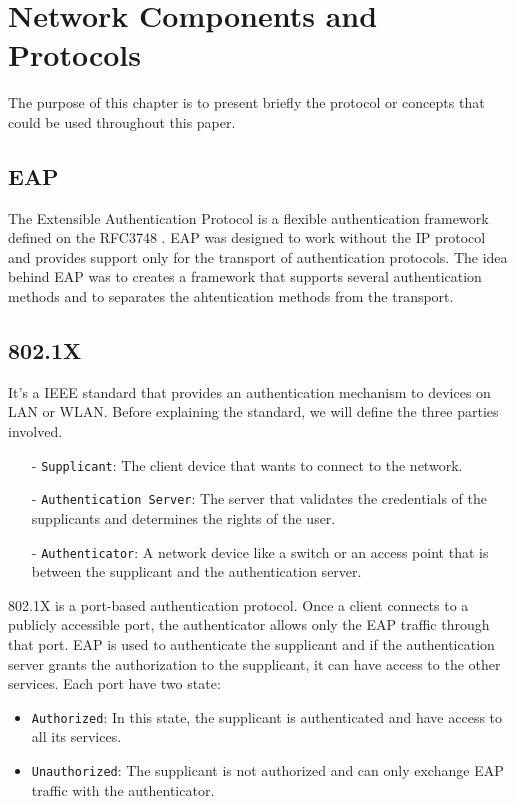 
\chapter{Network Components and Protocols} %

\label{Chapter3} %


The purpose of this chapter is to present briefly the protocol or concepts that could be used throughout this paper.
\section{EAP}
The Extensible Authentication Protocol is a flexible authentication framework defined on the RFC3748 \cite{rfc3748}. EAP was designed to work without the IP protocol and provides support only for the transport of authentication protocols. The idea behind EAP was to creates a framework that supports several authentication methods and to separates the ahtentication methods from the transport.

\section{802.1X}
It's a IEEE standard that provides an authentication mechanism to devices on LAN or WLAN. Before explaining the standard, we will define the three parties involved.
\begin{itemize}
	\item[-]\texttt{Supplicant}: The client device that wants to connect to the network.
	\item[-]\texttt{Authentication Server}: The server that validates the credentials of the supplicants and determines the rights of the user.
	\item[-]\texttt{Authenticator}: A network device like a switch or an access point that is between the supplicant and the authentication server.
\end{itemize} 
802.1X is a port-based authentication protocol. Once a client connects to a publicly accessible port, the authenticator allows only the EAP traffic through that port. EAP is used to authenticate the supplicant and if the authentication server grants the authorization to the supplicant, it can have access to the other services.
Each port have two state:
\begin{itemize}
\item \texttt{Authorized}: In this state, the supplicant is authenticated and have access to all its services.
\item \texttt{Unauthorized}: The supplicant is not authorized and can only exchange EAP traffic with the authenticator.
\end{itemize}


